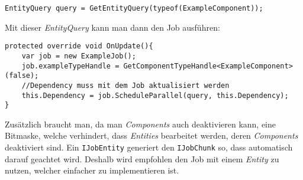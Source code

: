 \begin{lstlisting}[style=code, label=EntityQuery]
EntityQuery query = GetEntityQuery(typeof(ExampleComponent));
\end{lstlisting}
Mit dieser \textit{EntityQuery} kann man dann den Job ausführen:
\begin{lstlisting}[style=code, label=JobExecution]
protected override void OnUpdate(){
    var job = new ExampleJob();
    job.exampleTypeHandle = GetComponentTypeHandle<ExampleComponent>(false);
    //Dependency muss mit dem Job aktualisiert werden	
    this.Dependency = job.ScheduleParallel(query, this.Dependency);
}
\end{lstlisting}
Zusätzlich braucht man, da man \textit{Components} auch deaktivieren kann, eine Bitmaske, welche verhindert, dass \textit{Entities} bearbeitet werden, deren \textit{Components} deaktiviert sind. Ein \texttt{IJobEntity} generiert den \texttt{IJobChunk} so, dass automatisch darauf geachtet wird. Deshalb wird empfohlen den Job mit einem \textit{Entity} zu nutzen, welcher einfacher zu implementieren ist.